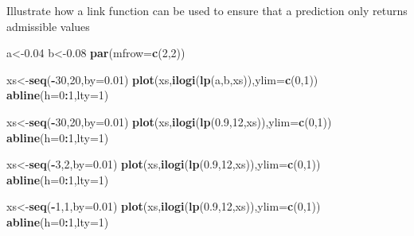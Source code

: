 \documentclass[
]{book}
\newenvironment{Shaded}{\begin{snugshade}}{\end{snugshade}}
\newcommand{\AttributeTok}[1]{\textcolor[rgb]{0.13,0.29,0.53}{#1}}
\newcommand{\DecValTok}[1]{\textcolor[rgb]{0.00,0.00,0.81}{#1}}
\newcommand{\FloatTok}[1]{\textcolor[rgb]{0.00,0.00,0.81}{#1}}
\newcommand{\FunctionTok}[1]{\textcolor[rgb]{0.13,0.29,0.53}{\textbf{#1}}}
\newcommand{\NormalTok}[1]{#1}
\newcommand{\OtherTok}[1]{\textcolor[rgb]{0.56,0.35,0.01}{#1}}
\newcommand{\SpecialCharTok}[1]{\textcolor[rgb]{0.81,0.36,0.00}{\textbf{#1}}}
\begin{document}
Illustrate how a link function can be used to ensure that a prediction only returns admissible values

\begin{Shaded}
\begin{Highlighting}[]
\NormalTok{a}\OtherTok{\textless{}{-}}\FloatTok{0.04}
\NormalTok{b}\OtherTok{\textless{}{-}}\FloatTok{0.08}
\FunctionTok{par}\NormalTok{(}\AttributeTok{mfrow=}\FunctionTok{c}\NormalTok{(}\DecValTok{2}\NormalTok{,}\DecValTok{2}\NormalTok{))}

\NormalTok{xs}\OtherTok{\textless{}{-}}\FunctionTok{seq}\NormalTok{(}\SpecialCharTok{{-}}\DecValTok{30}\NormalTok{,}\DecValTok{20}\NormalTok{,}\AttributeTok{by=}\FloatTok{0.01}\NormalTok{)}
\FunctionTok{plot}\NormalTok{(xs,}\FunctionTok{ilogi}\NormalTok{(}\FunctionTok{lp}\NormalTok{(a,b,xs)),}\AttributeTok{ylim=}\FunctionTok{c}\NormalTok{(}\DecValTok{0}\NormalTok{,}\DecValTok{1}\NormalTok{))}
\FunctionTok{abline}\NormalTok{(}\AttributeTok{h=}\DecValTok{0}\SpecialCharTok{:}\DecValTok{1}\NormalTok{,}\AttributeTok{lty=}\DecValTok{1}\NormalTok{)}


\NormalTok{xs}\OtherTok{\textless{}{-}}\FunctionTok{seq}\NormalTok{(}\SpecialCharTok{{-}}\DecValTok{30}\NormalTok{,}\DecValTok{20}\NormalTok{,}\AttributeTok{by=}\FloatTok{0.01}\NormalTok{)}
\FunctionTok{plot}\NormalTok{(xs,}\FunctionTok{ilogi}\NormalTok{(}\FunctionTok{lp}\NormalTok{(}\FloatTok{0.9}\NormalTok{,}\DecValTok{12}\NormalTok{,xs)),}\AttributeTok{ylim=}\FunctionTok{c}\NormalTok{(}\DecValTok{0}\NormalTok{,}\DecValTok{1}\NormalTok{))}
\FunctionTok{abline}\NormalTok{(}\AttributeTok{h=}\DecValTok{0}\SpecialCharTok{:}\DecValTok{1}\NormalTok{,}\AttributeTok{lty=}\DecValTok{1}\NormalTok{)}


\NormalTok{xs}\OtherTok{\textless{}{-}}\FunctionTok{seq}\NormalTok{(}\SpecialCharTok{{-}}\DecValTok{3}\NormalTok{,}\DecValTok{2}\NormalTok{,}\AttributeTok{by=}\FloatTok{0.01}\NormalTok{)}
\FunctionTok{plot}\NormalTok{(xs,}\FunctionTok{ilogi}\NormalTok{(}\FunctionTok{lp}\NormalTok{(}\FloatTok{0.9}\NormalTok{,}\DecValTok{12}\NormalTok{,xs)),}\AttributeTok{ylim=}\FunctionTok{c}\NormalTok{(}\DecValTok{0}\NormalTok{,}\DecValTok{1}\NormalTok{))}
\FunctionTok{abline}\NormalTok{(}\AttributeTok{h=}\DecValTok{0}\SpecialCharTok{:}\DecValTok{1}\NormalTok{,}\AttributeTok{lty=}\DecValTok{1}\NormalTok{)}


\NormalTok{xs}\OtherTok{\textless{}{-}}\FunctionTok{seq}\NormalTok{(}\SpecialCharTok{{-}}\DecValTok{1}\NormalTok{,}\DecValTok{1}\NormalTok{,}\AttributeTok{by=}\FloatTok{0.01}\NormalTok{)}
\FunctionTok{plot}\NormalTok{(xs,}\FunctionTok{ilogi}\NormalTok{(}\FunctionTok{lp}\NormalTok{(}\FloatTok{0.9}\NormalTok{,}\DecValTok{12}\NormalTok{,xs)),}\AttributeTok{ylim=}\FunctionTok{c}\NormalTok{(}\DecValTok{0}\NormalTok{,}\DecValTok{1}\NormalTok{))}
\FunctionTok{abline}\NormalTok{(}\AttributeTok{h=}\DecValTok{0}\SpecialCharTok{:}\DecValTok{1}\NormalTok{,}\AttributeTok{lty=}\DecValTok{1}\NormalTok{)}
\end{Highlighting}
\end{Shaded}
\end{document}
